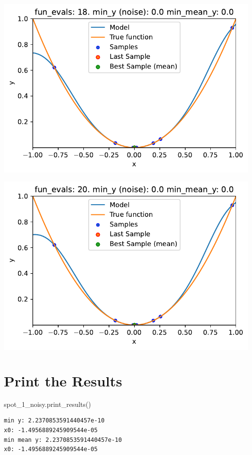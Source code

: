 \documentclass[
  letterpaper,
  DIV=11,
  numbers=noendperiod]{scrreprt}
\newenvironment{Shaded}{\begin{snugshade}}{\end{snugshade}}
\newcommand{\NormalTok}[1]{\textcolor[rgb]{0.00,0.23,0.31}{#1}}
\begin{document}
\includegraphics{014_num_spot_ocba_files/figure-pdf/cell-6-output-8.pdf}

\includegraphics{014_num_spot_ocba_files/figure-pdf/cell-6-output-9.pdf}

\section{Print the Results}\label{print-the-results-4}

\begin{Shaded}
\begin{Highlighting}[]
\NormalTok{spot\_1\_noisy.print\_results()}
\end{Highlighting}
\end{Shaded}

\begin{verbatim}
min y: 2.2370853591440457e-10
x0: -1.4956889245909544e-05
min mean y: 2.2370853591440457e-10
x0: -1.4956889245909544e-05
\end{verbatim}
\end{document}
